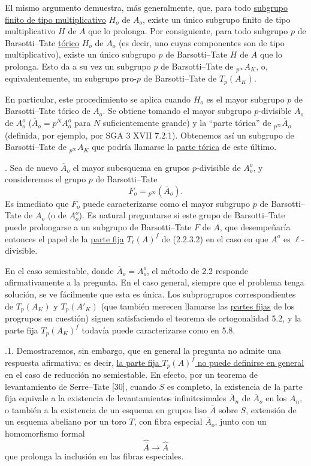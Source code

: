 El mismo argumento demuestra, más generalmente, que, para todo
\underline{subgrupo finito de tipo multiplicativo} $H_o$ de $A_o$,
existe un único subgrupo finito de tipo multiplicativo $H$ de $A$ que
lo prolonga. Por consiguiente, para todo subgrupo $p$ de Barsotti--Tate
\underline{tórico} $H_o$ de $A_o$ (es decir, uno cuyas componentes son
de tipo multiplicativo), existe un único subgrupo $p$ de Barsotti--Tate
$H$ de $A$ que lo prolonga. Esto da a su vez un subgrupo $p$ de
Barsotti--Tate de ${}_{p^\infty}A_K$, o, equivalentemente, un subgrupo
pro-$p$ de Barsotti--Tate de $T_p(A_K)$.

En particular, este procedimiento se aplica cuando $H_o$ es el mayor
subgrupo $p$ de Barsotti--Tate tórico de $A_o$. Se obtiene tomando el
mayor subgrupo $p$-divisible $\overline A_o$ de $A_o^o$
($\overline A_o=p^N A_o^o$ para $N$ suficientemente grande) y la
``parte tórica'' de ${}_{p^\infty}\overline A_o$ (definida, por ejemplo,
por SGA 3 XVII 7.2.1). Obtenemos así un subgrupo de Barsotti--Tate de
${}_{p^\infty}A_K$ que podría llamarse la \underline{parte tórica} de
este último.

\medskip
{}. Sea de nuevo $\overline A_o$ el mayor subesquema en grupos
$p$-divisible de $A_o^o$, y consideremos el grupo $p$ de
Barsotti--Tate
\[
 F_o={}_{p^\infty}(\overline A_o).
\]
Es inmediato que $F_o$ puede caracterizarse como el mayor subgrupo $p$
de Barsotti--Tate de $A_o$ (o de $A_o^o$). Es natural preguntarse si
este grupo de Barsotti--Tate puede prolongarse a un subgrupo de
Barsotti--Tate $F$ de $A$, que desempeñaría entonces el papel de la
\underline{parte fija} $T_\ell(A)^f$ de (2.2.3.2) en el caso en que
$A^o$ es $\ell$-divisible.


En el caso semiestable, donde $\overline A_o=A_o^o$, el método de 2.2
responde afirmativamente a la pregunta. En el caso general, siempre que
el problema tenga solución, se ve fácilmente que esta es única. Los
subprogrupos correspondientes de $T_p(A_K)$ y $T_p(A'_K)$ (que también
merecen llamarse las \underline{partes fijas} de los progrupos en
cuestión) siguen satisfaciendo el teorema de ortogonalidad 5.2, y la
parte fija $T_p(A_K)^f$ todavía puede caracterizarse como en 5.8.

\medskip
{}.1. Demostraremos, sin embargo, que en general la pregunta no admite
una respuesta afirmativa; es decir, \underline{la parte fija
$T_p(A)^f$ no puede definirse en general} en el caso de reducción no
semiestable. En efecto, por un teorema de levantamiento de Serre--Tate
[30], cuando $S$ es completo, la existencia de la parte fija equivale a
la existencia de levantamientos infinitesimales $\overline A_n$ de
$\overline A_o$ en los $A_n$, o también a la existencia de un esquema
en grupos liso $\overline A$ sobre $S$, extensión de un esquema
abeliano por un toro $T$, con fibra especial $\overline A_o$, junto con
un homomorfismo formal
\[
 \widehat{\overline A}\longrightarrow\widehat A
\]
que prolonga la inclusión en las fibras especiales.

